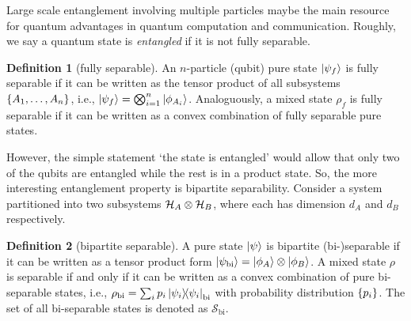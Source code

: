 \documentclass[
reprint,
aps,
pra,
floatfix,
]{revtex4-2}
\theoremstyle{plain}
\theoremstyle{definition}
\newtheorem{definition}{Definition}
\newcommand{\dm}{\rho}
\newcommand{\bi}{\text{bi}}
\newcommand{\separable}{\mathcal{S}}
\newcommand{\ppartition}{\mathcal{P}}
\begin{document}
Large scale entanglement involving multiple particles maybe the main resource for quantum advantages in quantum computation and communication.
Roughly, we say a quantum state is \emph{entangled} if it is not fully separable.
\begin{definition}[fully separable]\label{def:fully_separable}
	An $n$-particle (qubit) pure state $\ket{\psi_f}$ is fully separable 
	if it can be written as the tensor product of all subsystems $\qty{A_1,\dots,A_n}$, i.e., $\ket{\psi_f}=\bigotimes_{i=1}^n \ket{\phi_{A_i}}$.
	Analoguously, a mixed state $\dm_f$  is fully separable if it can be written as a convex combination of fully separable pure states.
\end{definition}
However, the simple statement `the state is entangled' would allow that only two of the qubits are entangled while the rest is in a product state.
So, the more interesting entanglement property is bipartite separability.
Consider a system partitioned into two subsystems $\mathcal{H}_A \otimes \mathcal{H}_B$, where each has dimension $d_A$ and $d_B$ respectively.
\begin{definition}[bipartite separable]\label{def:bipartite_separable}
	A pure state $\ket{\psi}$ is bipartite (bi-)separable if it can be written as a tensor product form 
	$\ket{\psi_{\bi}} = \ket{\phi_{A}}\otimes\ket{\phi_{B}}$. 
	A mixed state $\dm$ is separable if and only if it can be written as a convex combination of pure bi-separable states, i.e.,
	$\dm_{\bi}=\sum_i p_i \op{\psi_i}_\bi$ 
	with probability distribution $\qty{p_i}$.
	The set of all bi-separable states is denoted as $\separable_\bi$.
\end{definition}
\end{document}
